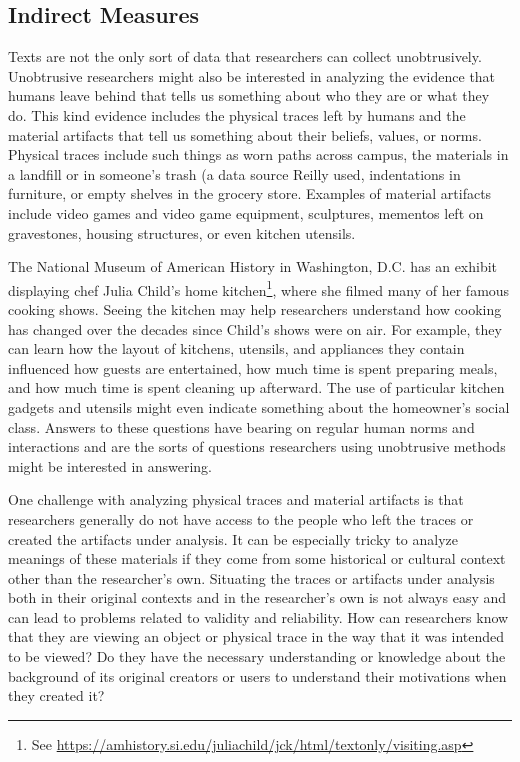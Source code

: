 \subsection{Indirect Measures}

Texts are not the only sort of data that researchers can collect unobtrusively. Unobtrusive researchers might also be interested in analyzing the evidence that humans leave behind that tells us something about who they are or what they do. This kind evidence includes the physical traces left by humans and the material artifacts that tell us something about their beliefs, values, or norms. Physical traces include such things as worn paths across campus, the materials in a landfill or in someone's trash (a data source Reilly used\cite{reilly1987comparison}, indentations in furniture, or empty shelves in the grocery store. Examples of material artifacts include video games and video game equipment, sculptures, mementos left on gravestones, housing structures, or even kitchen utensils.

The National Museum of American History in Washington, D.C. has an exhibit displaying chef Julia Child's home kitchen\footnote{See \url{https://amhistory.si.edu/juliachild/jck/html/textonly/visiting.asp}}, where she filmed many of her famous cooking shows. Seeing the kitchen may help researchers understand how cooking has changed over the decades since Child's shows were on air. For example, they can learn how the layout of kitchens, utensils, and appliances they contain influenced how guests are entertained, how much time is spent preparing meals, and how much time is spent cleaning up afterward. The use of particular kitchen gadgets and utensils might even indicate something about the homeowner's social class. Answers to these questions have bearing on regular human norms and interactions and are the sorts of questions researchers using unobtrusive methods might be interested in answering.

One challenge with analyzing physical traces and material artifacts is that researchers generally do not have access to the people who left the traces or created the artifacts under analysis. It can be especially tricky to analyze meanings of these materials if they come from some historical or cultural context other than the researcher's own. Situating the traces or artifacts under analysis both in their original contexts and in the researcher's own is not always easy and can lead to problems related to validity and reliability. How can researchers know that they are viewing an object or physical trace in the way that it was intended to be viewed? Do they have the necessary understanding or knowledge about the background of its original creators or users to understand their motivations when they created it?

